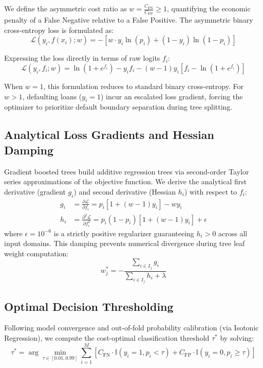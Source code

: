 \documentclass[11pt,a4paper]{article}
\begin{document}
We define the asymmetric cost ratio as $w = \frac{C_{\text{FN}}}{C_{\text{FP}}} \ge 1$, quantifying the economic penalty of a False Negative relative to a False Positive. The asymmetric binary cross-entropy loss is formulated as:
\begin{equation}
\mathcal{L}(y_i, f(x_i); w) = - \left[ w \cdot y_i \ln(p_i) + (1 - y_i) \ln(1 - p_i) \right]
\end{equation}

Expressing the loss directly in terms of raw logits $f_i$:
\begin{equation}
\mathcal{L}(y_i, f_i; w) = \ln(1 + e^{f_i}) - y_i f_i - (w - 1) y_i \left[ f_i - \ln(1 + e^{f_i}) \right]
\end{equation}

When $w = 1$, this formulation reduces to standard binary cross-entropy. For $w > 1$, defaulting loans ($y_i = 1$) incur an escalated loss gradient, forcing the optimizer to prioritize default boundary separation during tree splitting.

\subsection{Analytical Loss Gradients and Hessian Damping}
Gradient boosted trees build additive regression trees via second-order Taylor series approximations of the objective function. We derive the analytical first derivative (gradient $g_i$) and second derivative (Hessian $h_i$) with respect to $f_i$:
\begin{align}
g_i &= \frac{\partial \mathcal{L}}{\partial f_i} = p_i \left[ 1 + (w - 1) y_i \right] - w y_i \\
h_i &= \frac{\partial^2 \mathcal{L}}{\partial f_i^2} = p_i (1 - p_i) \left[ 1 + (w - 1) y_i \right] + \epsilon
\end{align}
where $\epsilon = 10^{-6}$ is a strictly positive regularizer guaranteeing $h_i > 0$ across all input domains. This damping prevents numerical divergence during tree leaf weight computation:
\begin{equation}
w_j^* = - \frac{\sum_{i \in I_j} g_i}{\sum_{i \in I_j} h_i + \lambda}
\end{equation}

\subsection{Optimal Decision Thresholding}
Following model convergence and out-of-fold probability calibration (via Isotonic Regression), we compute the cost-optimal classification threshold $\tau^*$ by solving:
\begin{equation}
\tau^* = \arg\min_{\tau \in [0.01, 0.99]} \sum_{i=1}^M \left[ C_{\text{FN}} \cdot \mathbb{I}(y_i = 1, p_i < \tau) + C_{\text{FP}} \cdot \mathbb{I}(y_i = 0, p_i \ge \tau) \right]
\end{equation}
\end{document}
